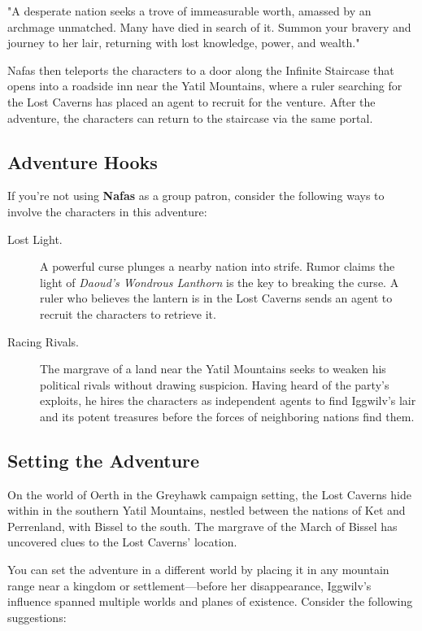 \documentclass[10pt,a4paper,twoside,bg=print,twocolumn,openany,nodeprecatedcode]{dndbook}
\begin{document}
\begin{DndReadAloud}{}
"A desperate nation seeks a trove of immeasurable worth, amassed by an archmage unmatched. Many have died in search of it. Summon your bravery and journey to her lair, returning with lost knowledge, power, and wealth."

\end{DndReadAloud}

Nafas then teleports the characters to a door along the Infinite Staircase that opens into a roadside inn near the Yatil Mountains, where a ruler searching for the Lost Caverns has placed an agent to recruit for the venture. After the adventure, the characters can return to the staircase via the same portal.

\subsection{Adventure Hooks}
If you're not using \textbf{Nafas} as a group patron, consider the following ways to involve the characters in this adventure:


\begin{description}
\item[Lost Light.]
A powerful curse plunges a nearby nation into strife. Rumor claims the light of \textit{Daoud's Wondrous Lanthorn} is the key to breaking the curse. A ruler who believes the lantern is in the Lost Caverns sends an agent to recruit the characters to retrieve it.
\item[Racing Rivals.]
The margrave of a land near the Yatil Mountains seeks to weaken his political rivals without drawing suspicion. Having heard of the party's exploits, he hires the characters as independent agents to find Iggwilv's lair and its potent treasures before the forces of neighboring nations find them.
\end{description}

\subsection{Setting the Adventure}
On the world of Oerth in the Greyhawk campaign setting, the Lost Caverns hide within in the southern Yatil Mountains, nestled between the nations of Ket and Perrenland, with Bissel to the south. The margrave of the March of Bissel has uncovered clues to the Lost Caverns' location.

You can set the adventure in a different world by placing it in any mountain range near a kingdom or settlement—before her disappearance, Iggwilv's influence spanned multiple worlds and planes of existence. Consider the following suggestions:
\end{document}
